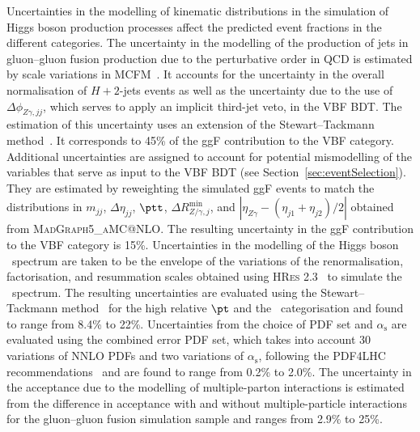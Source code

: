 Uncertainties in the modelling of kinematic distributions in the simulation of Higgs boson 
production processes affect the predicted event fractions in the different categories.
The uncertainty in the modelling of the production of jets in gluon--gluon fusion production due to
the perturbative order in QCD is estimated by scale variations in MCFM~\cite{Campbell:2010ff}. It
accounts for the uncertainty in the overall normalisation of $H+2$-jets events as well as the 
uncertainty due to the use of $\Delta\phi_{Z\gamma,jj}$, which serves to apply an implicit third-jet
veto, in the VBF BDT. The estimation of this uncertainty uses 
an extension of the Stewart--Tackmann method~\cite{Stewart:2011cf, Gangal:2013nxa}. 
It corresponds to 45\%
of the ggF contribution to the VBF category.
Additional uncertainties are assigned to account for potential mismodelling of the variables that serve as input
to the VBF BDT (see Section~\ref{sec:eventSelection}). They are estimated by reweighting the simulated ggF
events to match the distributions in $m_{jj}$, $\Delta\eta_{jj}$, $\ptt$, $\Delta R^\mathrm{min}_{Z/\gamma, j}$, 
and $|\eta_{Z\gamma}-(\eta_{j1} + \eta_{j2})/2|$ obtained from \textsc{MadGraph5\_aMC@NLO}. The resulting uncertainty
in the ggF contribution to the VBF category is 15\%.
Uncertainties in the modelling of the Higgs boson \pt\ spectrum are taken to be the envelope of the
variations of the renormalisation, factorisation, and resummation scales 
obtained using \textsc{HRes} 2.3~\cite{Grazzini:2013mca} to simulate the \pt\ spectrum.
The resulting uncertainties are evaluated using 
the Stewart--Tackmann method~\cite{Stewart:2011cf, Gangal:2013nxa} for the high relative $\pt$ and the \ptt\ categorisation
and found to range from 8.4\% to 22\%. 
Uncertainties from the choice of PDF set and $\alpha_\mathrm{s}$ are evaluated using the combined error PDF
set, which takes into account 30 variations of NNLO PDFs and two variations of $\alpha_\mathrm{s}$, 
following the PDF4LHC recommendations~\cite{Butterworth:2015oua} and are found to range from 
0.2\% to 2.0\%.
The uncertainty in the acceptance due to the modelling of multiple-parton interactions is estimated 
from the difference in acceptance with and without multiple-particle interactions for the gluon--gluon
fusion simulation sample and ranges from 2.9\% to 25\%. 


